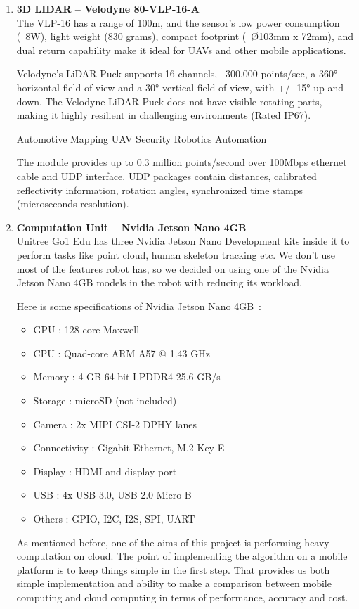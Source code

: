 \documentclass[12pt]{article}
\begin{document}
\begin{enumerate}
        \item \textbf{3D LIDAR – Velodyne 80-VLP-16-A~\cite{VelodyneLiDAR}} \\
        The VLP-16 has a range of 100m, and the sensor's low power consumption (~8W), light weight (830 grams), compact footprint (~Ø103mm x 72mm), and dual return capability make it ideal for UAVs and other mobile applications. 

        Velodyne’s LiDAR Puck supports 16 channels, ~300,000 points/sec, a 360° horizontal field of view and a 30° vertical field of view, with +/- 15° up and down. The Velodyne LiDAR Puck does not have visible rotating parts, making it highly resilient in challenging environments (Rated IP67). 

        Automotive Mapping UAV Security Robotics Automation 

        The module provides up to 0.3 million points/second over 100Mbps ethernet cable and UDP interface. UDP packages contain distances, calibrated reflectivity information, rotation angles, synchronized time stamps (microseconds resolution). 

        \item \textbf{Computation Unit – Nvidia Jetson Nano 4GB} \\
        Unitree Go1 Edu has three Nvidia Jetson Nano Development kits inside it to perform tasks like point cloud, human skeleton tracking etc. We don’t use most of the features robot has, so we decided on using one of the Nvidia Jetson Nano 4GB models in the robot with reducing its 
        workload. 

        Here is some specifications of Nvidia Jetson Nano 4GB~\cite{JatsonNano}: 
        
        \begin{itemize}
            \item GPU		:	128-core Maxwell 
            \item CPU		:	Quad-core ARM A57 @ 1.43 GHz 
            \item Memory	:	4 GB 64-bit LPDDR4 25.6 GB/s 
            \item Storage	:	microSD (not included) 
            \item Camera	:	2x MIPI CSI-2 DPHY lanes 
            \item Connectivity	:	Gigabit Ethernet, M.2 Key E 
            \item Display	:	HDMI and display port 
            \item USB		:	4x USB 3.0, USB 2.0 Micro-B 
            \item Others		:	GPIO, I2C, I2S, SPI, UART 
        \end{itemize}

        As mentioned before, one of the aims of this project is performing heavy computation on cloud. The point of implementing the algorithm on a mobile platform is to keep things simple in the first step. That provides us both simple implementation and ability to make a comparison between mobile computing and cloud computing in terms of performance, accuracy and cost. 

    \end{enumerate}
\end{document}
